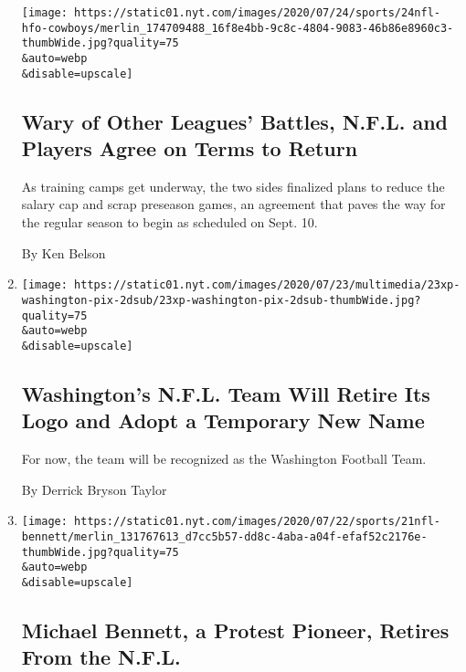 \begin{enumerate}
  \texttt{[image: https://static01.nyt.com/images/2020/07/24/sports/24nfl-hfo-cowboys/merlin\_174709488\_16f8e4bb-9c8c-4804-9083-46b86e8960c3-thumbWide.jpg?quality=75\\\&auto=webp\\\&disable=upscale]}

  \hypertarget{wary-of-other-leagues-battles-nfl-and-players-agree-on-terms-to-return}{%
  \subsection{Wary of Other Leagues' Battles, N.F.L. and Players Agree
  on Terms to
  Return}\label{wary-of-other-leagues-battles-nfl-and-players-agree-on-terms-to-return}}

  As training camps get underway, the two sides finalized plans to
  reduce the salary cap and scrap preseason games, an agreement that
  paves the way for the regular season to begin as scheduled on Sept.
  10.

  By Ken Belson
\item
  \href{/2020/07/23/sports/football/washington-football-team-name-logo.html}{}

  \texttt{[image: https://static01.nyt.com/images/2020/07/23/multimedia/23xp-washington-pix-2dsub/23xp-washington-pix-2dsub-thumbWide.jpg?quality=75\\\&auto=webp\\\&disable=upscale]}

  \hypertarget{washingtons-nfl-team-will-retire-its-logo-and-adopt-a-temporary-new-name}{%
  \subsection{Washington's N.F.L. Team Will Retire Its Logo and Adopt a
  Temporary New
  Name}\label{washingtons-nfl-team-will-retire-its-logo-and-adopt-a-temporary-new-name}}

  For now, the team will be recognized as the Washington Football Team.

  By Derrick Bryson Taylor
\item
  \href{/2020/07/21/sports/football/michael-bennett-retire-nfl.html}{}

  \texttt{[image: https://static01.nyt.com/images/2020/07/22/sports/21nfl-bennett/merlin\_131767613\_d7cc5b57-dd8c-4aba-a04f-efaf52c2176e-thumbWide.jpg?quality=75\\\&auto=webp\\\&disable=upscale]}

  \hypertarget{michael-bennett-a-protest-pioneer-retires-from-the-nfl}{%
  \subsection{Michael Bennett, a Protest Pioneer, Retires From the
  N.F.L.}\label{michael-bennett-a-protest-pioneer-retires-from-the-nfl}}


\end{enumerate}
